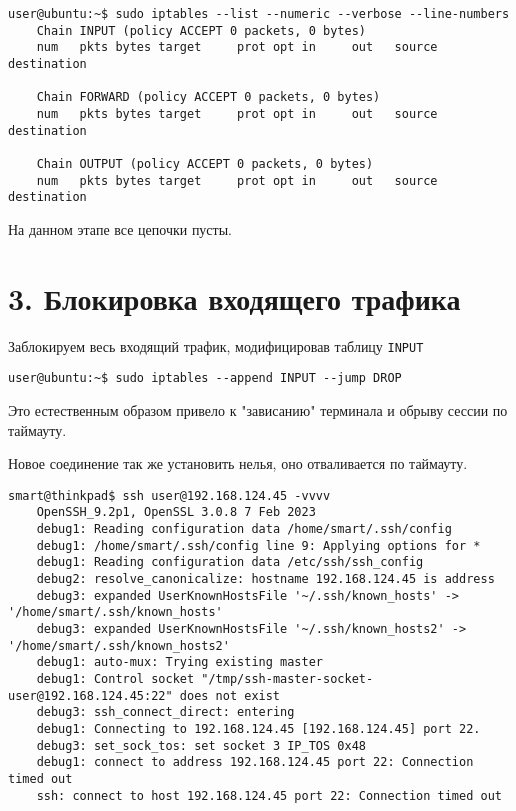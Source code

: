\begin{Verbatim}[frame=single]
    user@ubuntu:~$ sudo iptables --list --numeric --verbose --line-numbers
    Chain INPUT (policy ACCEPT 0 packets, 0 bytes)
    num   pkts bytes target     prot opt in     out   source    destination

    Chain FORWARD (policy ACCEPT 0 packets, 0 bytes)
    num   pkts bytes target     prot opt in     out   source    destination

    Chain OUTPUT (policy ACCEPT 0 packets, 0 bytes)
    num   pkts bytes target     prot opt in     out   source    destination
\end{Verbatim}

На данном этапе все цепочки пусты.

\section*{3. Блокировка входящего трафика}

Заблокируем весь входящий трафик, модифицировав таблицу \texttt{INPUT}

\begin{Verbatim}[frame=single]
    user@ubuntu:~$ sudo iptables --append INPUT --jump DROP
\end{Verbatim}

Это естественным образом привело к "зависанию" терминала и обрыву сессии по таймауту.

Новое соединение так же установить нелья, оно отваливается по таймауту.

\begin{Verbatim}[frame=single]
    smart@thinkpad$ ssh user@192.168.124.45 -vvvv
    OpenSSH_9.2p1, OpenSSL 3.0.8 7 Feb 2023
    debug1: Reading configuration data /home/smart/.ssh/config
    debug1: /home/smart/.ssh/config line 9: Applying options for *
    debug1: Reading configuration data /etc/ssh/ssh_config
    debug2: resolve_canonicalize: hostname 192.168.124.45 is address
    debug3: expanded UserKnownHostsFile '~/.ssh/known_hosts' -> '/home/smart/.ssh/known_hosts'
    debug3: expanded UserKnownHostsFile '~/.ssh/known_hosts2' -> '/home/smart/.ssh/known_hosts2'
    debug1: auto-mux: Trying existing master
    debug1: Control socket "/tmp/ssh-master-socket-user@192.168.124.45:22" does not exist
    debug3: ssh_connect_direct: entering
    debug1: Connecting to 192.168.124.45 [192.168.124.45] port 22.
    debug3: set_sock_tos: set socket 3 IP_TOS 0x48
    debug1: connect to address 192.168.124.45 port 22: Connection timed out
    ssh: connect to host 192.168.124.45 port 22: Connection timed out
\end{Verbatim}

